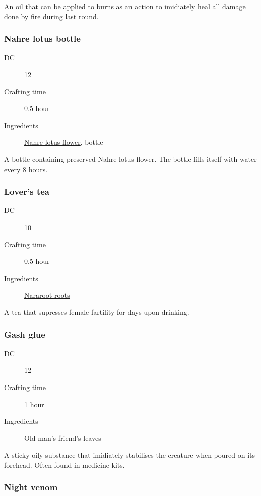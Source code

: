 An oil that can be applied to burns as an action to imidiately heal all damage done by fire 
during last round.

\subsubsection{Nahre lotus bottle}
\label{Nahre lotus bottle}

\begin{description}
\item [DC] 12
\item [Crafting time] 0.5 hour
\item [Ingredients] \hyperref[Nahre Lotus]{Nahre lotus flower}, bottle
\end{description}

A bottle containing preserved Nahre lotus flower. The bottle fills itself with water every 8 hours.

\subsubsection{Lover's tea}
\label{Lover's tea}

\begin{description}
\item [DC] 10
\item [Crafting time] 0.5 hour
\item [Ingredients] \hyperref[Nararoot]{Nararoot roots}
\end{description}

A tea that supresses female fartility for  days upon drinking.

\subsubsection{Gash glue}
\label{Gash glue}

\begin{description}
\item [DC] 12
\item [Crafting time] 1 hour
\item [Ingredients] \hyperref[Old Man's Friend]{Old man's friend's leaves}
\end{description}

A sticky oily substance that imidiately stabilises the creature when poured on its forehead. 
Often found in medicine kits.

\subsubsection{Night venom}
\label{Night venom}

